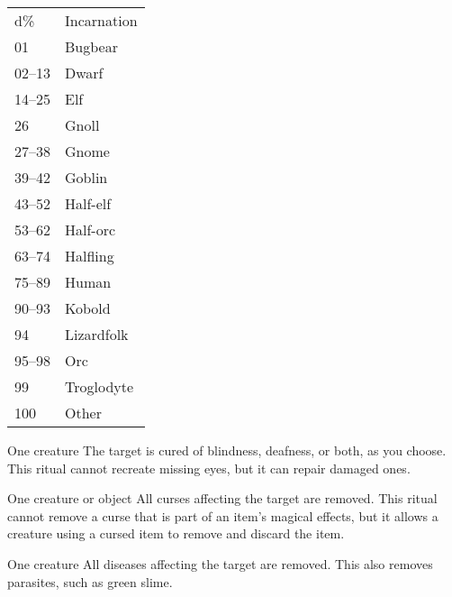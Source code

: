 \begin{dtable}
    \begin{tabularx}{\columnwidth}{l >{\lcol}X}
        d\% & Incarnation \\
        01 & Bugbear \\
        02--13 & Dwarf \\
        14--25 & Elf \\
        26 & Gnoll \\
        27--38 & Gnome \\
        39--42 & Goblin \\
        43--52 & Half-elf \\
        53--62 & Half-orc \\
        63--74 & Halfling \\
        75--89 & Human \\
        90--93 & Kobold \\
        94 & Lizardfolk \\
        95--98 & Orc \\
        99 & Troglodyte \\
        100 & Other
    \end{tabularx}
\end{dtable}

\begin{spelltarget}{One creature}
    \spelleffect The target is cured of blindness, deafness, or both, as you choose. This ritual cannot recreate missing eyes, but it can repair damaged ones.
\end{spelltarget}

\begin{spelltarget}{One creature or object}
    \spelleffect All curses affecting the target are removed. This ritual cannot remove a curse that is part of an item's magical effects, but it allows a creature using a cursed item to remove and discard the item.
\end{spelltarget}

\begin{spelltarget}{One creature}
    \spelleffect All diseases affecting the target are removed. This also removes parasites, such as green slime.
\end{spelltarget}

